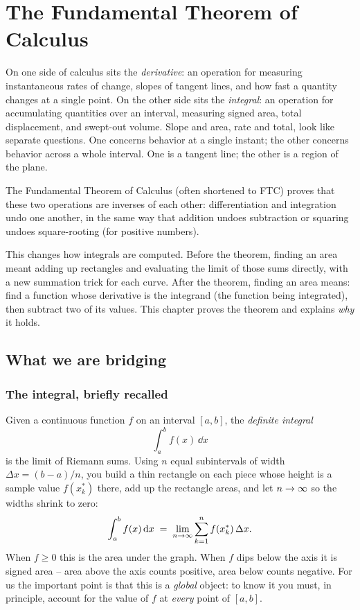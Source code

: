 \chapter{The Fundamental Theorem of Calculus}

On one side of calculus sits the \emph{derivative}: an operation for measuring
instantaneous rates of change, slopes of tangent lines, and how fast a quantity
changes at a single point. On the other side sits the \emph{integral}: an
operation for accumulating quantities over an interval, measuring
signed area, total displacement, and swept-out volume. Slope and area, rate and
total, look like separate questions. One concerns behavior at a single instant;
the other concerns behavior across a whole interval. One is a tangent line; the other is a region
of the plane.

The Fundamental Theorem of Calculus (often shortened to FTC) proves that these two
operations are inverses of each other: differentiation and integration undo one
another, in the same way that addition undoes subtraction or squaring undoes
square-rooting (for positive numbers).

This changes how integrals are computed. Before the theorem, finding an area meant
adding up rectangles and evaluating the limit of those sums directly, with a new
summation trick for each curve.
After the theorem, finding an area means: find a function whose derivative is
the integrand (the function being integrated), then subtract two of its values.
This chapter proves the theorem and explains \emph{why} it holds.

\section{What we are bridging}

\subsection{The integral, briefly recalled}

Given a continuous function $f$ on an interval $[a,b]$, the \emph{definite integral}
\[
  \int_a^b f(x)\,\dd x
\]
is the limit of Riemann sums. Using $n$ equal subintervals of width $\Delta x = (b-a)/n$,
you build a thin rectangle on each piece whose height is a sample value $f(x_k^*)$ there,
add up the rectangle areas, and let $n\to\infty$ so the widths shrink to zero:
\[
  \int_a^b f(x)\,\mathrm{d} x \;=\; \lim_{n\to\infty}\sum_{k=1}^{n} f(x_k^*)\,\Delta x .
\]
When $f\ge 0$ this is the area under the graph. When $f$ dips below the axis it
is signed area -- area above the axis counts positive, area below counts
negative. For us the important point is that this is a \emph{global} object: to
know it you must, in principle, account for the value of $f$ at \emph{every}
point of $[a,b]$.

